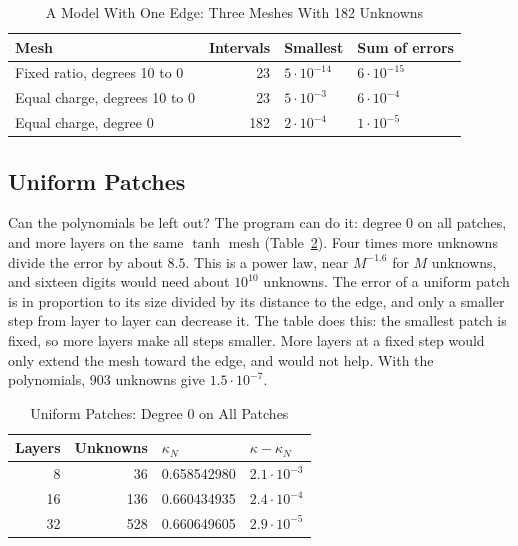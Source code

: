 \documentclass[journal]{IEEEtran}
\begin{document}
\begin{table}[!t]
\caption{A Model With One Edge: Three Meshes With 182 Unknowns}
\label{tab:model}
\centering
\footnotesize
\setlength{\tabcolsep}{3pt}
\begin{tabular}{lrll}
\toprule
Mesh & Intervals & Smallest & Sum of errors\\
\midrule
Fixed ratio, degrees 10 to 0 & 23 & $5\cdot10^{-14}$ & $6\cdot10^{-15}$\\
Equal charge, degrees 10 to 0 & 23 & $5\cdot10^{-3}$ & $6\cdot10^{-4}$\\
Equal charge, degree 0 & 182 & $2\cdot10^{-4}$ & $1\cdot10^{-5}$\\
\bottomrule
\end{tabular}
\end{table}

\subsection{Uniform Patches}
Can the polynomials be left out? The program can do it: degree 0 on all patches, and more layers on the same $\tanh$ mesh (Table~\ref{tab:uniform}). Four times more unknowns divide the error by about $8.5$. This is a power law, near $M^{-1.6}$ for $M$ unknowns, and sixteen digits would need about $10^{10}$ unknowns. The error of a uniform patch is in proportion to its size divided by its distance to the edge, and only a smaller step from layer to layer can decrease it. The table does this: the smallest patch is fixed, so more layers make all steps smaller. More layers at a fixed step would only extend the mesh toward the edge, and would not help. With the polynomials, 903 unknowns give $1.5\cdot10^{-7}$.

\begin{table}[!t]
\caption{Uniform Patches: Degree 0 on All Patches}
\label{tab:uniform}
\centering
\begin{tabular}{rrll}
\toprule
Layers & Unknowns & $\kappa_N$ & $\kappa-\kappa_N$\\
\midrule
8 & 36 & 0.658542980 & $2.1\cdot10^{-3}$\\
16 & 136 & 0.660434935 & $2.4\cdot10^{-4}$\\
32 & 528 & 0.660649605 & $2.9\cdot10^{-5}$\\
\bottomrule
\end{tabular}
\end{table}
\end{document}
